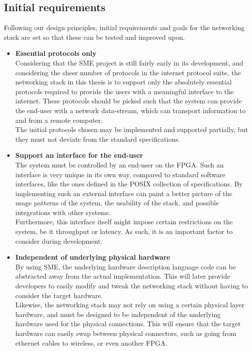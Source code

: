 \subsection{Initial requirements}
Following our design principles, initial requirements and goals for the
networking stack are set so that these can be tested and improved upon.
\begin{itemize}
\item \textbf{Essential protocols only}\\
Considering that the SME project is still fairly early in its development, and considering
the sheer number of protocols in the internet protocol suite, the networking
stack in this thesis is to support only the absolutely essential protocols
required to provide the users with a meaningful interface to the internet.
These protocols should be picked such that the system can provide the end-user
with a network data-stream, which can transport information to and from a remote
computer.\\
The initial protocols chosen may be implemented and supported partially, but
they must not deviate from the standard specifications.

\item \textbf{Support an interface for the end-user}\\
The system must be controlled by an end-user on the FPGA. Such an interface is
very unique in its own way, compared to standard software interfaces, like the
ones defined in the POSIX collection of specifications.
By implementing such an external interface can paint a better picture of the
usage patterns of the system, the usability of the stack, and possible
integrations with other systems.\\
Furthermore, this interface itself might impose certain restrictions on the
system, be it throughput or latency. As such, it is an important factor to
consider during development.

\item \textbf{Independent of underlying physical hardware}\\
By using SME, the underlying hardware description language code can be abstracted
away from the actual implementation. This will later provide developers to easily
modify and tweak the networking stack without having to consider the target
hardware.\\
Likewise, the networking stack may not rely on using a certain physical layer hardware,
and must be designed to be independent of the underlying hardware used for the
physical connections. This will ensure that the target hardware can easily
swap between physical connectors, such as going from ethernet cables to wireless,
or even another FPGA.
\end{itemize}

